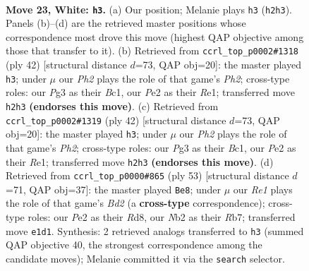 \documentclass[11pt]{article}
\begin{document}
\clearpage

\begin{figure}[p]\centering
\begin{subfigure}{0.46\textwidth}\centering
\resizebox{\linewidth}{!}{%
\newchessgame
\chessboard[
  setfen={2r1b1k1/p1r2pp1/n3p3/1p5p/3P1Pn1/1P4P1/1N2P2P/R1B1RBK1 w - - 0 23},
  showmover=false,
  pgfstyle=straightmove, color=movearrow, markmove={h2-h3}
]}
\caption{}
\end{subfigure}\hfill
\begin{subfigure}{0.46\textwidth}\centering
\resizebox{\linewidth}{!}{%
\newchessgame
\chessboard[
  setfen={2rr2k1/pp2bppp/2b1p3/P7/4NPn1/2P5/1P4PP/R1B1RBK1 w - - 1 22},
  showmover=false,
  pgfstyle=straightmove, color=movearrow, markmove={h2-h3}
]}
\caption{}
\end{subfigure}
\\[4pt]
\begin{subfigure}{0.46\textwidth}\centering
\resizebox{\linewidth}{!}{%
\newchessgame
\chessboard[
  setfen={2rr2k1/pp2bppp/2b1p3/P7/4NPn1/2P5/1P4PP/R1B1RBK1 w - - 1 22},
  showmover=false,
  pgfstyle=straightmove, color=movearrow, markmove={h2-h3}
]}
\caption{}
\end{subfigure}\hfill
\begin{subfigure}{0.46\textwidth}\centering
\resizebox{\linewidth}{!}{%
\newchessgame
\chessboard[
  setfen={3r2k1/1r1b1p2/2p1p2p/p5p1/Nn1P4/1B3P2/PP4PP/2RR2K1 b - - 1 27},
  showmover=false,
  pgfstyle=straightmove, color=movearrow, markmove={d7-e8}
]}
\caption{}
\end{subfigure}
\caption{\textbf{Move 23, White: \texttt{h3}.} (a) Our position; Melanie plays \texttt{h3} (\texttt{h2h3}). Panels (b)--(d) are the retrieved master positions whose correspondence most drove this move (highest QAP objective among those that transfer to it). (b) Retrieved from \texttt{ccrl\_top\_p0002\#1318} (ply 42) [structural distance $d$=73, QAP obj=20]: the master played \texttt{h3}; under $\mu$ our \emph{Ph2} plays the role of that game's \emph{Ph2}; cross-type roles: our \emph{P}g3 as their \emph{B}c1, our \emph{P}e2 as their \emph{R}e1; transferred move \texttt{h2h3} \textbf{(endorses this move)}. (c) Retrieved from \texttt{ccrl\_top\_p0002\#1319} (ply 42) [structural distance $d$=73, QAP obj=20]: the master played \texttt{h3}; under $\mu$ our \emph{Ph2} plays the role of that game's \emph{Ph2}; cross-type roles: our \emph{P}g3 as their \emph{B}c1, our \emph{P}e2 as their \emph{R}e1; transferred move \texttt{h2h3} \textbf{(endorses this move)}. (d) Retrieved from \texttt{ccrl\_top\_p0000\#865} (ply 53) [structural distance $d$=71, QAP obj=37]: the master played \texttt{Be8}; under $\mu$ our \emph{Re1} plays the role of that game's \emph{Bd2} (a \textbf{cross-type} correspondence); cross-type roles: our \emph{P}e2 as their \emph{R}d8, our \emph{N}b2 as their \emph{R}b7; transferred move \texttt{e1d1}. Synthesis: 2 retrieved analogs transferred to \texttt{h3} (summed QAP objective 40, the strongest correspondence among the candidate moves); Melanie committed it via the \texttt{search} selector.}
\label{fig:thought-m44}
\end{figure}
\end{document}
